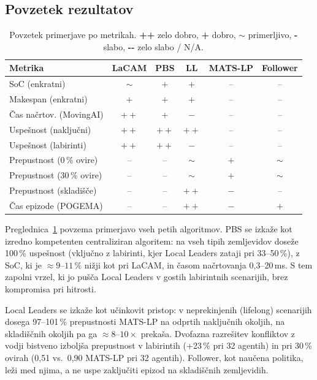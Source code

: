 \documentclass[sigconf,nonacm]{acmart}
\begin{document}
\subsection{Povzetek rezultatov}

\begin{table}[H]
\centering
\caption{Povzetek primerjave po metrikah. \textbf{++} zelo dobro, \textbf{+} dobro,
$\sim$ primerljivo, \textbf{-} slabo, \textbf{-{}-} zelo slabo / N/A.}
\label{tab:summary}
\small
\setlength{\tabcolsep}{4pt}
\begin{tabular}{lccccc}
\toprule
\textbf{Metrika} & \textbf{LaCAM} & \textbf{PBS} & \textbf{LL} & \textbf{MATS-LP} & \textbf{Follower} \\
\midrule
SoC (enkratni)            & $\sim$ & $+$    & $+$    & --   & -- \\
Makespan (enkratni)       & $+$    & $+$    & $+$    & --   & -- \\
Čas načrtov. (MovingAI)   & $++$   & $+$    & $-$    & --   & -- \\
Uspešnost (naključni)     & $++$   & $++$   & $++$   & --   & -- \\
Uspešnost (labirinti)     & $++$   & $++$   & $-$    & --   & -- \\
Prepustnost (0\,\% ovire)  & --     & --     & $\sim$ & $+$  & $\sim$ \\
Prepustnost (30\,\% ovire) & --     & --     & $\sim$ & $+$  & $\sim$ \\
Prepustnost (skladišče)    & --     & --     & $++$   & $-$  & -- \\
Čas epizode (POGEMA)      & --     & --     & $++$   & $-$  & $+$ \\
\bottomrule
\end{tabular}
\end{table}

Preglednica~\ref{tab:summary} povzema primerjavo vseh petih algoritmov.
PBS se izkaže kot izredno kompetenten centraliziran algoritem: na vseh tipih
zemljevidov doseže 100\,\% uspešnost (vključno z labirinti, kjer Local Leaders
zataji pri 33--50\,\%), z SoC, ki je $\approx 9$--$11\,\%$ nižji kot pri
LaCAM, in časom načrtovanja 0{,}3--20\,ms. S tem zapolni vrzel, ki jo pušča
Local Leaders v gostih labirintnih scenarijih, brez kompromisa pri hitrosti.

Local Leaders se izkaže kot učinkovit pristop: v neprekinjenih (lifelong)
scenarijih dosega 97--101\,\% prepustnosti MATS-LP na odprtih naključnih
okoljih, na skladiščnih okoljih pa ga $\approx 8$--$10\times$ prekaša. Dvofazna razrešitev konfliktov
z vodji bistveno izboljša prepustnost v labirintih (+23\,\% pri 32 agentih) in pri
30\,\% ovirah (0{,}51 vs.\ 0{,}90 MATS-LP pri 32 agentih). Follower, kot naučena
politika, leži med njima, a ne uspe zaključiti epizod na skladiščnih zemljevidih.
\end{document}
